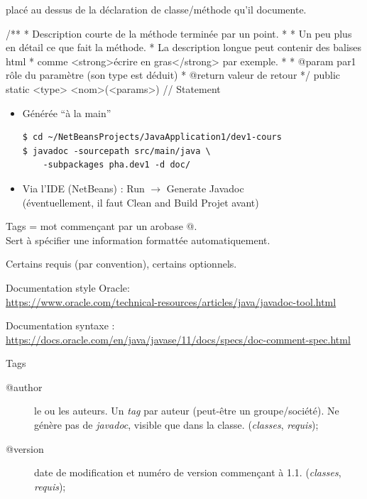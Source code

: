 \begin{hideedit}
\begin{frame}[fragile]{}
  \pause
   placé \alert{au dessus} de la déclaration
  de classe/méthode qu'il documente.
\end{frame}

\begin{frame}[fragile]{}
  \begin{java}
/**
 * Description courte de la méthode terminée par un point.
 *
 * Un peu plus en détail ce que fait la méthode.
 * La description longue peut contenir des balises html
 * comme <strong>écrire en gras</strong> par exemple.
 *
 * @param par1 rôle du paramètre (son type est déduit)
 * @return valeur de retour
 */
public static <type> <nom>(<params>) {
    // Statement
}
  \end{java}
\end{frame}

\begin{frame}[fragile]{}
  \begin{itemize}
    \item Générée ``à la main''
      \begin{verbatim}
$ cd ~/NetBeansProjects/JavaApplication1/dev1-cours
$ javadoc -sourcepath src/main/java \
    -subpackages pha.dev1 -d doc/
      \end{verbatim}
    \item Via l'IDE (NetBeans) : Run \(\rightarrow\) Generate Javadoc\\
      (éventuellement, il faut Clean and Build Projet avant)
  \end{itemize}
\end{frame}

\begin{frame}{Tags}
   = mot commençant par un arobase @.\\
  Sert à spécifier une information formattée automatiquement.

  \pause
  Certains requis (par convention), certains optionnels.

  Documentation style Oracle:\\
  \url{https://www.oracle.com/technical-resources/articles/java/javadoc-tool.html}

  Documentation syntaxe :\\
  \url{https://docs.oracle.com/en/java/javase/11/docs/specs/doc-comment-spec.html}
\end{frame}
\begin{frame}{Tags}
  \begin{description}
    \item[@author] le ou les auteurs. Un \textit{tag} 
      par auteur (peut-être un groupe/société). Ne génère pas
      de \textit{javadoc}, visible que dans la classe.
      (\textit{classes}, \textit{requis});
    \item[@version] date de modification et numéro de version
      commençant à 1.1.  (\textit{classes}, \textit{requis});


\end{description}
\end{frame}
\end{hideedit}
